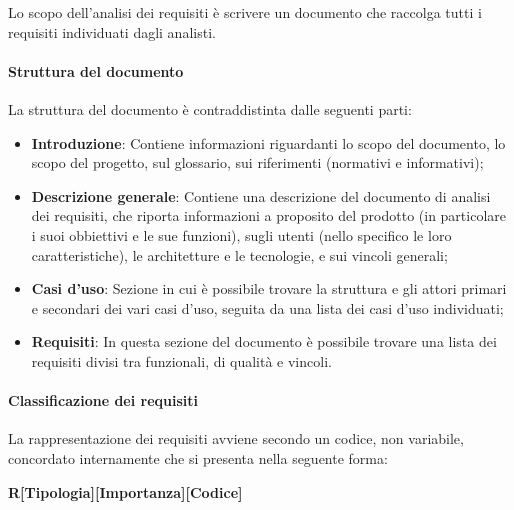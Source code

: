 \documentclass[../norme_di_progetto.tex]{subfiles}
\begin{document}
Lo scopo dell'analisi dei requisiti è scrivere un documento che raccolga tutti i requisiti individuati dagli analisti.

\paragraph{Struttura del documento}

La struttura del documento è contraddistinta dalle seguenti parti:
\begin{itemize}
    \item \textbf{Introduzione}: Contiene informazioni riguardanti lo scopo del documento, lo scopo del progetto, sul glossario, sui riferimenti (normativi e informativi);
    \item \textbf{Descrizione generale}: Contiene una descrizione del documento di analisi dei requisiti, che riporta informazioni a proposito del prodotto (in particolare i suoi obbiettivi e le sue funzioni), sugli utenti (nello specifico le loro caratteristiche), le architetture e le tecnologie, e sui vincoli generali;
    \item \textbf{Casi d'uso}: Sezione in cui è possibile trovare la struttura e gli attori primari e secondari dei vari casi d'uso, seguita da una lista dei casi d'uso individuati;
    \item \textbf{Requisiti}: In questa sezione del documento è possibile trovare una lista dei requisiti divisi tra funzionali, di qualità e vincoli.
\end{itemize}

\paragraph{Classificazione dei requisiti}
La rappresentazione dei requisiti avviene secondo un codice, non variabile, concordato internamente che si presenta nella seguente forma:\\
\begin{center}
    \textbf{R[Tipologia][Importanza][Codice]}
\end{center}
\end{document}
